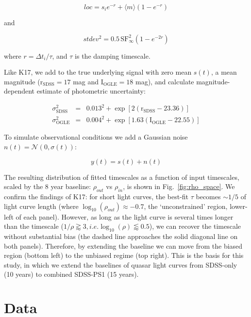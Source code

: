 \documentclass[twocolumn]{aastex62}
\begin{document}
\begin{equation}
loc = s_{i} e ^ { - r  }  + \langle m \rangle \left( 1 - e ^{ - r }\right)
\end{equation}

and 

\begin{equation}
stdev^{2} =  0.5  \, \mathrm{SF}_{\infty}^{2} \left( 1 - e ^{  - 2 r  }  \right)
\end{equation}

where  $r = \Delta t_{i} / \tau$, and $\tau$ is the damping timescale.


Like K17, we add to the true underlying signal with zero mean $s(t)$, a mean magnitude  ($\mathrm{r_{SDSS}}=17$ mag and $\mathrm{I_{OGLE}}=18$ mag), and calculate magnitude-dependent estimate of photometric uncertainty:

\begin{eqnarray}
\sigma_{\mathrm{SDSS}}^{2} &=& 0.013^{2} + \exp{[2 (\mathrm{r_{SDSS}}-23.36)]} \\
\sigma_{\mathrm{OGLE}}^{2} &=& 0.004^{2} + \exp{[1.63 (\mathrm{I_{OGLE}} - 22.55)]}
\end{eqnarray}

To simulate observational conditions  we add a Gaussian noise $n(t) = \mathcal{N}(0,\sigma(t))$:

\begin{equation}
y(t) = s(t) + n(t) 
\end{equation}

The resulting distribution of fitted timescales  as a function of input timescales, scaled by the  8 year baseline: $\rho_{out}$ vs $\rho_{in}$, is shown in Fig.~\ref{fig:rho_space}. We confirm the findings of K17: for short light curves, the best-fit $\tau$ becomes $\sim 1/5$ of light curve length (where $\log_{10}{(\rho_{out})} \approx -0.7$, the `unconstrained' region, lower-left of each panel). However, as long as the light curve is several times longer than the timescale ($1/\rho \gtrapprox 3, i.e. \log_{10}{(\rho)} \lessapprox 0.5$), we can recover the timescale without substantial bias (the dashed line approaches the solid diagonal line on both panels). Therefore, by extending the baseline we can move from the biased region (bottom left) to the unbiased regime (top right). This is the basis for this study,  in which we extend the baselines of quasar light curves from SDSS-only (10 years) to combined SDSS-PS1 (15 years). 


\section{Data}
\label{sec:data}
\end{document}
